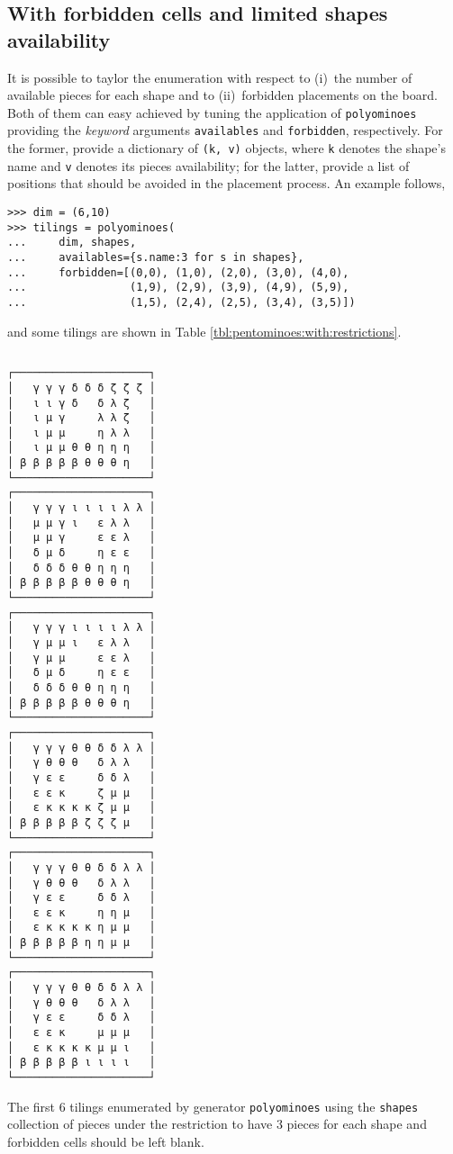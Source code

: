\subsection*{With forbidden cells and limited shapes availability}

It is possible to taylor the enumeration with respect to (i)~the number of
available pieces for each shape and to (ii)~forbidden placements on the board.
Both of them can easy achieved by tuning the application of \verb|polyominoes|
providing the \textit{keyword} arguments \verb|availables| and
\verb|forbidden|, respectively. For the former, provide a dictionary of
\verb|(k, v)| objects, where \verb|k| denotes the shape's name and \verb|v|
denotes its pieces availability; for the latter, provide a list of
positions that should be avoided in the placement process. An example follows,
\begin{verbatim}
>>> dim = (6,10)
>>> tilings = polyominoes(
...     dim, shapes,
...     availables={s.name:3 for s in shapes},
...     forbidden=[(0,0), (1,0), (2,0), (3,0), (4,0),
...                (1,9), (2,9), (3,9), (4,9), (5,9),
...                (1,5), (2,4), (2,5), (3,4), (3,5)])
\end{verbatim}
and some tilings are shown in Table \ref{tbl:pentominoes:with:restrictions}.

\begin{margintable}%
\inputminted[baselinestretch=0.8]{python}{backtracking/pentominoes-regular-snippet.py}
\begin{Verbatim}[baselinestretch=0.1]
┌─────────────────────┐
│   γ γ γ δ δ δ ζ ζ ζ │
│   ι ι γ δ   δ λ ζ   │
│   ι μ γ     λ λ ζ   │
│   ι μ μ     η λ λ   │
│   ι μ μ θ θ η η η   │
│ β β β β β θ θ θ η   │
└─────────────────────┘
┌─────────────────────┐
│   γ γ γ ι ι ι ι λ λ │
│   μ μ γ ι   ε λ λ   │
│   μ μ γ     ε ε λ   │
│   δ μ δ     η ε ε   │
│   δ δ δ θ θ η η η   │
│ β β β β β θ θ θ η   │
└─────────────────────┘
┌─────────────────────┐
│   γ γ γ ι ι ι ι λ λ │
│   γ μ μ ι   ε λ λ   │
│   γ μ μ     ε ε λ   │
│   δ μ δ     η ε ε   │
│   δ δ δ θ θ η η η   │
│ β β β β β θ θ θ η   │
└─────────────────────┘
┌─────────────────────┐
│   γ γ γ θ θ δ δ λ λ │
│   γ θ θ θ   δ λ λ   │
│   γ ε ε     δ δ λ   │
│   ε ε κ     ζ μ μ   │
│   ε κ κ κ κ ζ μ μ   │
│ β β β β β ζ ζ ζ μ   │
└─────────────────────┘
┌─────────────────────┐
│   γ γ γ θ θ δ δ λ λ │
│   γ θ θ θ   δ λ λ   │
│   γ ε ε     δ δ λ   │
│   ε ε κ     η η μ   │
│   ε κ κ κ κ η μ μ   │
│ β β β β β η η μ μ   │
└─────────────────────┘
┌─────────────────────┐
│   γ γ γ θ θ δ δ λ λ │
│   γ θ θ θ   δ λ λ   │
│   γ ε ε     δ δ λ   │
│   ε ε κ     μ μ μ   │
│   ε κ κ κ κ μ μ ι   │
│ β β β β β ι ι ι ι   │
└─────────────────────┘
\end{Verbatim}
\caption{The first $6$ tilings enumerated by generator \texttt{polyominoes}
using the \texttt{shapes} collection of pieces under the restriction to
have $3$ pieces for each shape and forbidden cells should be left blank.}
\label{tbl:pentominoes:with:restrictions}
\end{margintable}

